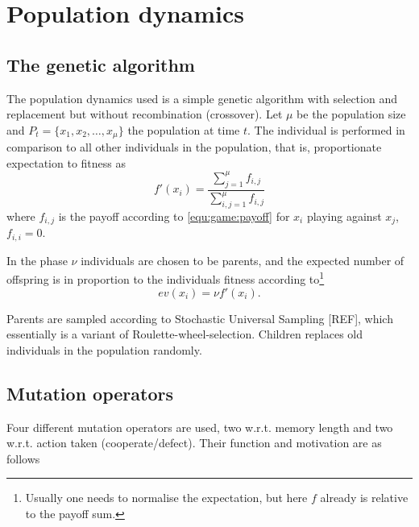 \section{Population dynamics}\label{sec:genetic}

\subsection{The genetic algorithm}
The population dynamics used is a simple genetic algorithm with selection and replacement but without recombination (crossover). Let $\mu$ be the population size and $P_{t} = \{x_1, x_2, \dots, x_\mu\}$ the population at time $t$. The individual  is performed in comparison to all other individuals in the population, that is, proportionate expectation to fitness as
\begin{equation*}
f'(x_i) = \frac{\sum_{j = 1}^\mu f_{i,j}}{\sum_{i,j = 1}^\mu f_{i, j}}
\end{equation*}
where $f_{i, j}$ is the payoff according to \ref{equ:game:payoff} for $x_i$ playing against $x_j$, $f_{i,i} = 0$.


In the  phase $\nu$ individuals are chosen to be parents, and the expected number of offspring is in proportion to the individuals fitness according to\footnote{Usually one needs to normalise the expectation, but here $f$ already is relative to the payoff sum.}
\begin{equation*}
ev(x_i) = \nu f'(x_i).
\end{equation*}
 
Parents are sampled according to Stochastic Universal Sampling [REF], which essentially is a variant of Roulette-wheel-selection. Children replaces old individuals in the population randomly.


\subsection{Mutation operators}
Four different mutation operators are used, two w.r.t. memory length and two w.r.t. action taken (cooperate/defect). Their function and motivation are as follows

